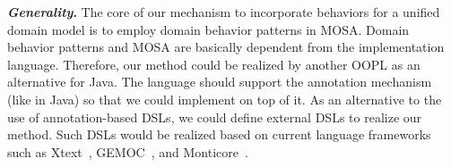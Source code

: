 
\textbf{\textit{Generality}.} The core of our mechanism to incorporate behaviors for a unified domain model is to employ domain behavior patterns in MOSA. Domain behavior patterns and MOSA are basically dependent from the implementation language. Therefore, our method could be realized by another OOPL as an alternative for Java. The language should support the annotation mechanism (like in Java) so that we could implement \agldcsl on top of it. As an alternative to the use of annotation-based DSLs, we could define external DSLs to realize our method. Such DSLs would be realized based on current language frameworks such as Xtext~\cite{bettini_implementing_2016}, GEMOC~\cite{combemale_language_2017}, and Monticore~\cite{rumpe_monticore_2021}.






